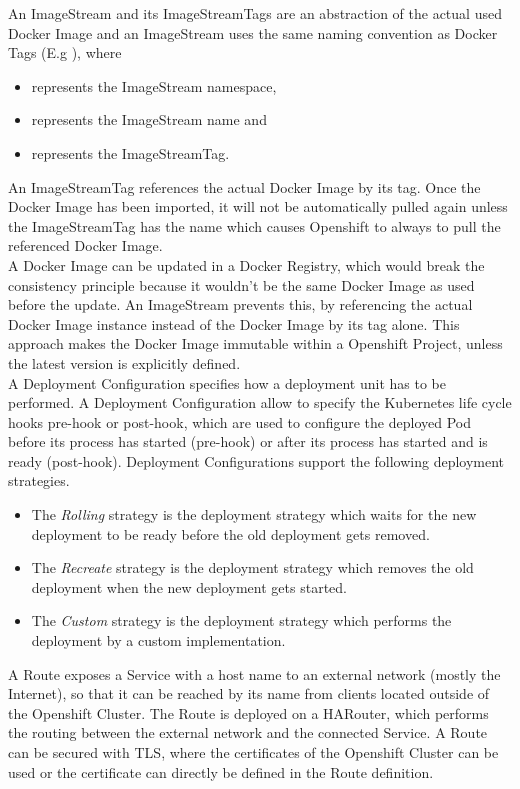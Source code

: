 An ImageStream and its ImageStreamTags are an abstraction of the actual used Docker Image and an ImageStream uses the same naming convention as Docker Tags (E.g ), where
\begin{itemize}
	\item {} represents the ImageStream namespace,
	\item {} represents the ImageStream name and
	\item {} represents the ImageStreamTag.
\end{itemize}
An ImageStreamTag references the actual Docker Image by its tag. Once the Docker Image has been imported, it will not be automatically pulled again unless the ImageStreamTag has the name  which causes Openshift to always to pull the referenced Docker Image. \\

A Docker Image can be updated in a Docker Registry, which would break the consistency principle because it wouldn't be the same Docker Image as used before the update. An ImageStream prevents this, by referencing the actual Docker Image instance instead of the Docker Image by its tag alone. This approach makes the Docker Image immutable within a Openshift Project, unless the latest version is explicitly defined.  \\

A Deployment Configuration specifies how a deployment unit has to be performed. A Deployment Configuration allow to specify the Kubernetes life cycle hooks pre-hook or post-hook, which are used to configure the deployed Pod before its process has started (pre-hook) or after its process has started and is ready (post-hook). Deployment Configurations support the following deployment strategies.
\begin{itemize}
	\item The \emph{Rolling} strategy is the deployment strategy which waits for the new deployment to be ready before the old deployment gets removed.
	\item The \emph{Recreate} strategy is the deployment strategy which removes the old deployment when the new deployment gets started.
	\item The \emph{Custom} strategy is the deployment strategy which performs the deployment by a custom implementation.
\end{itemize}

A Route exposes a Service with a host name to an external network (mostly the Internet), so that it can be reached by its name from clients located outside of the Openshift Cluster. The Route is deployed on a HARouter, which performs the routing between the external network and the connected Service. A Route can be secured with TLS, where the certificates of the Openshift Cluster can be used or the certificate can directly be defined in the Route definition. \\